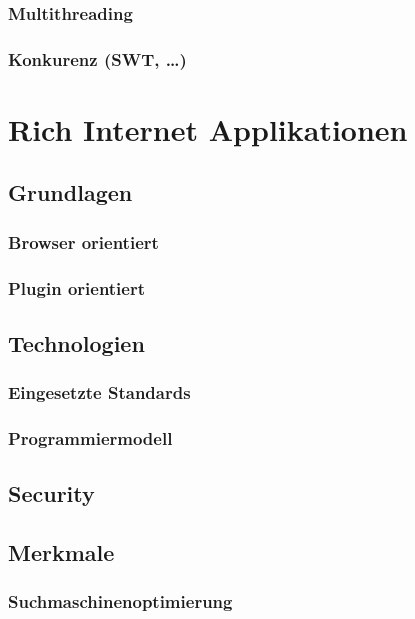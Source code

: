 \documentclass[abstracton, listof=totocnumbered,
bibliography=totocnumbered]{scrreprt}
\begin{document}
  \subsection{Multithreading}
  
  \subsection{Konkurenz (SWT, \ldots)}
  
  \chapter{Rich Internet Applikationen}
  
  \section{Grundlagen}

  \subsection{Browser orientiert}
  
  \subsection{Plugin orientiert}
  
  \section{Technologien}
  
  \subsection{Eingesetzte Standards}
  
  \subsection{Programmiermodell}
  
  \section{Security}
  
  \section{Merkmale}
    
  \subsection{Suchmaschinenoptimierung}
  
\end{document}
